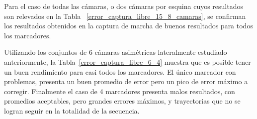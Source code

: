 Para el caso de todas las cámaras, o dos cámaras por esquina cuyos resultados son relevados en la Tabla~ \ref{error_captura_libre_15_8_camaras}, se confirman los resultados obtenidos en la captura de marcha de buenos resultados para todos los marcadores.


Utilizando los conjuntos de 6 cámaras asimétricas lateralmente estudiado anteriormente, la Tabla~\ref{error_captura_libre_6_4} muestra que es posible tener un buen rendimiento para casi todos los marcadores. El único marcador con problemas, presenta un buen promedio de error pero un pico de error máximo a corregir. Finalmente el caso de 4 marcadores presenta malos resultados, con promedios aceptables, pero grandes errores máximos, y trayectorias que no se logran seguir en la totalidad de la secuencia.



